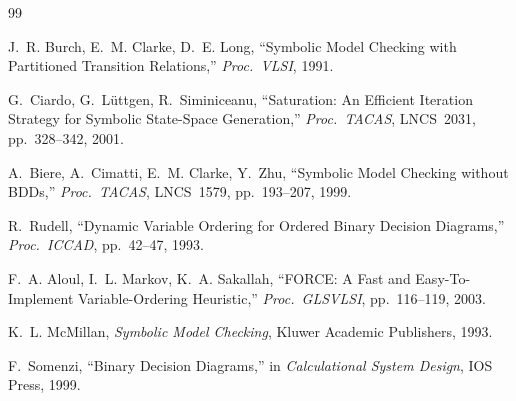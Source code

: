 \documentclass[11pt]{article}
\begin{document}
\begin{thebibliography}{99}

J.~R. Burch, E.~M. Clarke, D.~E. Long,
``Symbolic Model Checking with Partitioned Transition Relations,''
\emph{Proc.\ VLSI}, 1991.

G.~Ciardo, G.~L\"uttgen, R.~Siminiceanu,
``Saturation: An Efficient Iteration Strategy for Symbolic State-Space Generation,''
\emph{Proc.\ TACAS}, LNCS~2031, pp.~328--342, 2001.

A.~Biere, A.~Cimatti, E.~M. Clarke, Y.~Zhu,
``Symbolic Model Checking without BDDs,''
\emph{Proc.\ TACAS}, LNCS~1579, pp.~193--207, 1999.

R.~Rudell,
``Dynamic Variable Ordering for Ordered Binary Decision Diagrams,''
\emph{Proc.\ ICCAD}, pp.~42--47, 1993.

F.~A. Aloul, I.~L. Markov, K.~A. Sakallah,
``FORCE: A Fast and Easy-To-Implement Variable-Ordering Heuristic,''
\emph{Proc.\ GLSVLSI}, pp.~116--119, 2003.

K.~L. McMillan,
\emph{Symbolic Model Checking},
Kluwer Academic Publishers, 1993.

F.~Somenzi,
``Binary Decision Diagrams,''
in \emph{Calculational System Design}, IOS Press, 1999.

\end{thebibliography}
\end{document}
